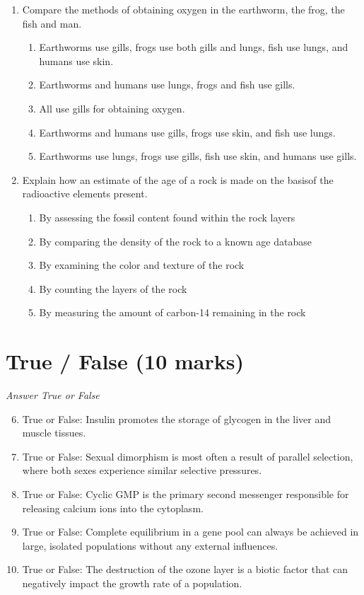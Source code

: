 \documentclass[12pt]{article}
\begin{document}
\begin{enumerate}[label=\arabic*.]
\begin{enumerate}[label=(\alph*)]
    \item fish, frog
\end{enumerate}
\item Compare the methods of obtaining oxygen in the earthworm, the frog, the fish and man.
\begin{enumerate}[label=(\alph*)]
    \item Earthworms use gills, frogs use both gills and lungs, fish use lungs, and humans use skin.
    \item Earthworms and humans use lungs, frogs and fish use gills.
    \item All use gills for obtaining oxygen.
    \item Earthworms and humans use gills, frogs use skin, and fish use lungs.
    \item Earthworms use lungs, frogs use gills, fish use skin, and humans use gills.
\end{enumerate}
\item Explain how an estimate of the age of a rock is made on the basisof the radioactive elements present.
\begin{enumerate}[label=(\alph*)]
    \item By assessing the fossil content found within the rock layers
    \item By comparing the density of the rock to a known age database
    \item By examining the color and texture of the rock
    \item By counting the layers of the rock
    \item By measuring the amount of carbon-14 remaining in the rock
\end{enumerate}
\end{enumerate}

\section*{True / False (10 marks)}
\textit{Answer True or False}
\begin{enumerate}[label=\arabic*.]
\setcounter{enumi}{5}
\item True or False: Insulin promotes the storage of glycogen in the liver and muscle tissues.
\item True or False: Sexual dimorphism is most often a result of parallel selection, where both sexes experience similar selective pressures.
\item True or False: Cyclic GMP is the primary second messenger responsible for releasing calcium ions into the cytoplasm.
\item True or False: Complete equilibrium in a gene pool can always be achieved in large, isolated populations without any external influences.
\item True or False: The destruction of the ozone layer is a biotic factor that can negatively impact the growth rate of a population.
\end{enumerate}
\end{document}
